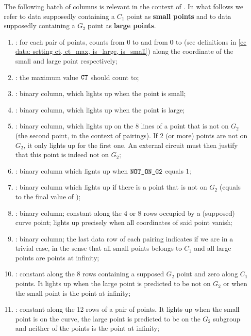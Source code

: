 The following batch of columns is relevant in the context of \instEcpairing{}.
In what follows we refer to data supposedly containing a $C_1$ point as \textbf{small points} and to data supposedly containing a $G_2$ point as \textbf{large points}.
\begin{enumerate}[resume]
      \item \ct:
            for each pair of points, counts from 0 to \ctMaxSmallPoint{} and from 0 to \ctMaxLargePoint{} (see definitions in \ref{ec data: setting ct, ct_max, is_large, is_small}) along the coordinate of the small and large point respectively;
      \item \maxCt:
            the maximum value $\texttt{CT}$ should count to;
      \item \isSmallPoint:
            binary column, which lights up when the point is small;
      \item \isLargePoint:
            binary column, which lights up when the point is large;
      \item \notOnGTwo{} \ecDataPrediction{}:
            binary column, which lights up on the 8 lines of a point that is not on $G_2$ (the second point, in the context of pairings). If 2 (or more) points are not on $G_2$, it only lights up for the first one. An external circuit must then justify that this point is indeed not on $G_2$;
      \item \notOnGTwoAcc:
            binary column which lignts up when $\texttt{NOT\_ON\_G2}$ equals $1$;
      \item \notOnGTwoAccMax:
            binary column which lights up if there is a point that is not on $G_2$ (equals to the final value of \notOnGTwoAcc);
      \item \isInfinity:
            binary column;
            constant along the 4 or 8 rows occupied by a (supposed) curve point;
            lights up precisely when all coordinates of said point vanish;
      \item \both{\trivialPairing}: binary column; the last data row of each pairing indicates if we are in a trivial case, in the sense that all small points belongs to $C_1$ and all large points are points at infinity;
      \item \both{\membershipTestRequired}:
            constant along the 8 rows containing a supposed $G_2$ point and zero along $C_1$ points. It lights up when the large point is predicted to be not on $G_2$ or when the small point is the point at infinity;
      \item \both{\acceptablePairOfPoints}:
            constant along the 12 rows of a pair of points. It lights up when the small point is on the curve, the large point is predicted to be on the $G_2$ subgroup and neither of the points is the point at infinity;
\end{enumerate}

